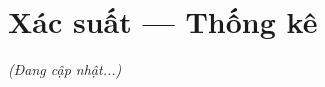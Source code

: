 
\chapter{Xác suất — Thống kê}


\begin{center}
  \textit{\color{ForumGray}(Đang cập nhật...)}
\end{center}
